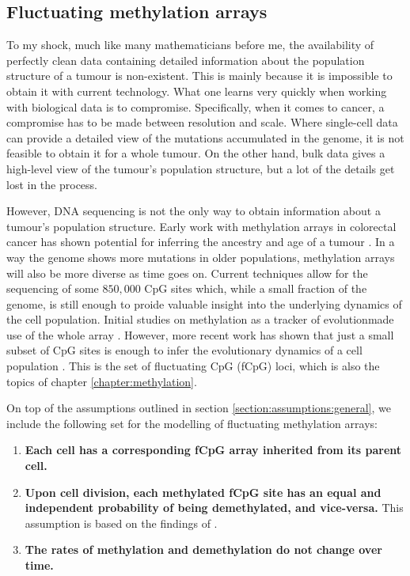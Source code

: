 \subsection{Fluctuating methylation arrays}
To my shock, much like many mathematicians before me, the availability of perfectly clean data containing detailed information
about the population structure of a tumour is non-existent. This is mainly because it is impossible to obtain it with current
technology. What one learns very quickly when working with biological data is to compromise. Specifically, when it comes to
cancer, a compromise has to be made between resolution and scale. Where single-cell data can provide a detailed view of the
mutations accumulated in the genome, it is not feasible to obtain it for a whole tumour. On the other hand, bulk data
gives a high-level view of the tumour's population structure, but a lot of the details get lost in the process. \par
However, DNA sequencing is not the only way to obtain information about a tumour's population structure. Early work with
methylation arrays in colorectal cancer has shown potential for inferring the ancestry and age of a tumour \cite{hong_using_2010,
siegmund_high_2011}. In a way the genome shows more mutations in older populations, methylation arrays will also be more diverse
as time goes on. Current techniques allow for the sequencing of some $850,000$ CpG sites which, while a small fraction of the
genome, is still enough to proide valuable insight into the underlying dynamics of the cell population. Initial studies on
methylation as a tracker of evolutionmade use of the whole array \cite{siegmund_modeling_2008, sottoriva_integrating_2010}.
However, more recent work has shown that just a small subset of CpG sites is enough to infer the evolutionary dynamics of a
cell population \cite{gabbutt_fluctuating_2022, gabbutt_evolutionary_2023}. This is the set of fluctuating CpG (fCpG) loci,
which is also the topics of chapter \ref{chapter:methylation}. \par
On top of the assumptions outlined in section \ref{section:assumptions:general}, we include the following set for the modelling
of fluctuating methylation arrays:
\begin{enumerate}[(i')]
    \item \textbf{Each cell has a corresponding fCpG array inherited from its parent cell.}
    \item \textbf{Upon cell division, each methylated fCpG site has an equal and independent probability of being demethylated,
        and vice-versa.} This assumption is based on the findings of \cite{gabbutt_fluctuating_2022, gabbutt_evolutionary_2023}.
    \item \textbf{The rates of methylation and demethylation do not change over time.}
\end{enumerate}


